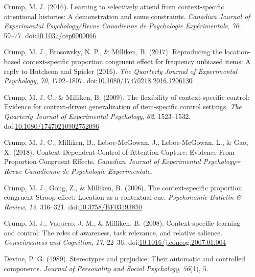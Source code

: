\documentclass[english,,man,floatsintext]{apa6}
\begin{document}
\leavevmode\hypertarget{ref-crump_learning_2016}{}%
Crump, M. J. (2016). Learning to selectively attend from context-specific attentional histories: A demonstration and some constraints. \emph{Canadian Journal of Experimental Psychology/Revue Canadienne de Psychologie Expérimentale}, \emph{70}, 59--77. doi:\href{https://doi.org/10.1037/cep0000066}{10.1037/cep0000066}

\leavevmode\hypertarget{ref-crump_reproducing_2017}{}%
Crump, M. J., Brosowsky, N. P., \& Milliken, B. (2017). Reproducing the location-based context-specific proportion congruent effect for frequency unbiased items: A reply to Hutcheon and Spieler (2016). \emph{The Quarterly Journal of Experimental Psychology}, \emph{70}, 1792--1807. doi:\href{https://doi.org/10.1080/17470218.2016.1206130}{10.1080/17470218.2016.1206130}

\leavevmode\hypertarget{ref-crump_flexibility_2009}{}%
Crump, M. J. C., \& Milliken, B. (2009). The flexibility of context-specific control: Evidence for context-driven generalization of item-specific control settings. \emph{The Quarterly Journal of Experimental Psychology}, \emph{62}, 1523--1532. doi:\href{https://doi.org/10.1080/17470210902752096}{10.1080/17470210902752096}

\leavevmode\hypertarget{ref-crump_context-dependent_2018}{}%
Crump, M. J. C., Milliken, B., Leboe-McGowan, J., Leboe-McGowan, L., \& Gao, X. (2018). Context-Dependent Control of Attention Capture: Evidence From Proportion Congruent Effects. \emph{Canadian Journal of Experimental Psychology= Revue Canadienne de Psychologie Experimentale}.

\leavevmode\hypertarget{ref-crump_context-specific_2006}{}%
Crump, M. J., Gong, Z., \& Milliken, B. (2006). The context-specific proportion congruent Stroop effect: Location as a contextual cue. \emph{Psychonomic Bulletin \& Review}, \emph{13}, 316--321. doi:\href{https://doi.org/10.3758/BF03193850}{10.3758/BF03193850}

\leavevmode\hypertarget{ref-crump_context-specific_2008}{}%
Crump, M. J., Vaquero, J. M., \& Milliken, B. (2008). Context-specific learning and control: The roles of awareness, task relevance, and relative salience. \emph{Consciousness and Cognition}, \emph{17}, 22--36. doi:\href{https://doi.org/10.1016/j.concog.2007.01.004}{10.1016/j.concog.2007.01.004}

\leavevmode\hypertarget{ref-devine_stereotypes_1989}{}%
Devine, P. G. (1989). Stereotypes and prejudice: Their automatic and controlled components. \emph{Journal of Personality and Social Psychology}, \emph{56}(1), 5.
\end{document}
